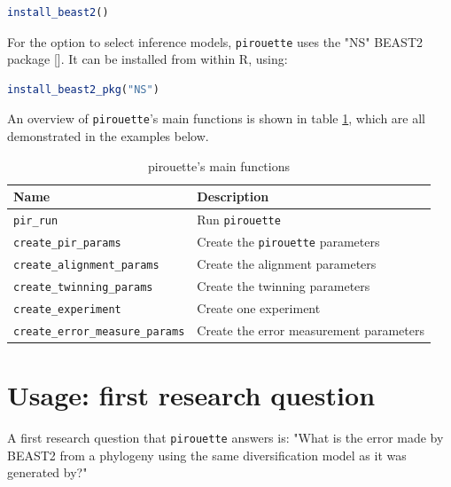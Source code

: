 \documentclass{article}
\begin{document}
\begin{lstlisting}[language=R, floatplacement=H, frame=single]
install_beast2()
\end{lstlisting}
For the option to select inference models,
\verb;pirouette; uses the "NS" BEAST2 package [\cite{maturana2018model}].
It can be installed from within R, using:

\begin{lstlisting}[language=R, floatplacement=H, frame=single]
install_beast2_pkg("NS")
\end{lstlisting}

An overview of \verb;pirouette;'s main functions is shown in 
table \ref{tab:functions}, which are all demonstrated in the examples
below.

\begin{table}[h]
\centering
\begin{tabular}{ | l | l | }
\hline
\textbf{Name} & \textbf{Description} \\
\hline
\verb;pir_run; & Run \verb;pirouette; \\
\verb;create_pir_params; & Create the \verb;pirouette; parameters \\
\hline
\verb;create_alignment_params; & Create the alignment parameters \\
\verb;create_twinning_params; & Create the twinning parameters \\
\verb;create_experiment; & Create one experiment \\
\verb;create_error_measure_params; & Create the error measurement parameters \\
\hline
\end{tabular}
\caption{pirouette's main functions}
\label{tab:functions}
\end{table}

\section{Usage: first research question}

A first research question that \verb;pirouette; answers is:
"What is the error made by BEAST2 from a phylogeny using the same diversification model as it was generated by?"
\end{document}

